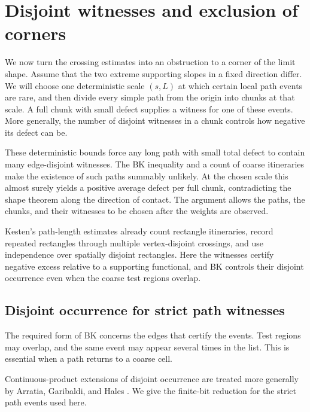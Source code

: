 \section{Disjoint witnesses and exclusion of corners}
\label{df:sec:witnesses}

We now turn the crossing estimates into an obstruction to a corner of the
limit shape. Assume that the two extreme supporting slopes in a fixed
direction differ. We will choose one deterministic scale $(s,L)$ at which
certain local path events are rare, and then divide every simple path from
the origin into chunks at that scale. A full chunk with small defect
supplies a witness for one of these events. More generally, the number of
disjoint witnesses in a chunk controls how negative its defect can be.

These deterministic bounds force any long path with small total defect to
contain many edge-disjoint witnesses. The BK inequality and a count of
coarse itineraries make the existence of such paths summably unlikely.
At the chosen scale this almost surely yields a positive average defect
per full chunk, contradicting the shape theorem along the direction of
contact. The argument allows the paths, the chunks, and their witnesses to
be chosen after the weights are observed.

Kesten's path-length estimates \cite[Section~3]{Kesten1980} already
count rectangle itineraries, record repeated rectangles through multiple
vertex-disjoint crossings, and use independence over spatially disjoint
rectangles. Here the witnesses certify negative excess relative to a
supporting functional, and BK controls their disjoint occurrence even
when the coarse test regions overlap.

\subsection{Disjoint occurrence for strict path witnesses}

The required form of BK concerns the edges that certify the events.
Test regions may overlap, and the same event may appear several times in
the list. This is essential when a path returns to a coarse cell.

Continuous-product extensions of disjoint occurrence are treated more
generally by Arratia, Garibaldi, and Hales \cite{AGH2018}. We give the
finite-bit reduction for the strict path events used here.

